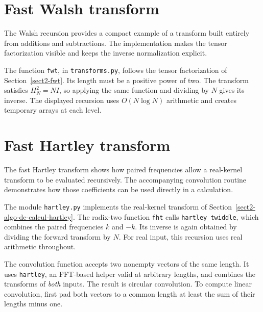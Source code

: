 \section{Fast Walsh transform}
\label{sect1-listing-fwt}

The Walsh recursion provides a compact example of a transform built entirely
from additions and subtractions. The implementation makes the tensor
factorization visible and keeps the inverse normalization explicit.

The function \texttt{fwt}, in \texttt{transforms.py}, follows the tensor
factorization of Section~\ref{sect2-fwt}. Its length must be a positive
power of two. The transform satisfies $H_N^2=NI$, so applying the same
function and dividing by $N$ gives its inverse. The displayed recursion
uses $O(N\log N)$ arithmetic and creates temporary arrays at each level.
\begin{listing}[H]
\caption{A recursive fast Walsh transform.}
\label{listing-fwt}
\end{listing}

\section{Fast Hartley transform}
\label{sect1-listing-fht}

The fast Hartley transform shows how paired frequencies allow a real-kernel
transform to be evaluated recursively. The accompanying convolution routine
demonstrates how those coefficients can be used directly in a calculation.

The module \texttt{hartley.py} implements the real-kernel transform
of Section~\ref{sect2-algo-de-calcul-hartley}. The radix-two function
\texttt{fht} calls \texttt{hartley\_twiddle}, which combines the paired
frequencies $k$ and $-k$. Its inverse is again obtained by dividing
the forward transform by $N$. For real input, this recursion uses real
arithmetic throughout.

The convolution function accepts two nonempty vectors of the same length.
It uses \texttt{hartley}, an FFT-based helper valid at arbitrary lengths,
and combines the transforms of \emph{both} inputs. The result is circular
convolution. To compute linear convolution, first pad both vectors to a
common length at least the sum of their lengths minus one.
\begin{listing}[H]
\caption{A radix-two fast Hartley transform.}
\label{listing-fht}
\end{listing}


